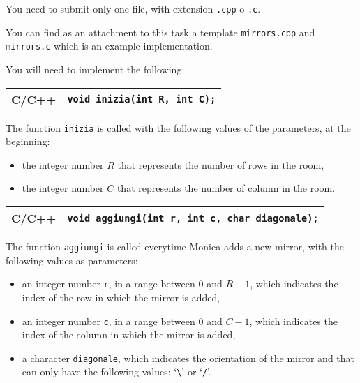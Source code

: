 
\Implementation

You need to submit only one file, with extension \texttt{.cpp} o \texttt{.c}.

\begin{warning}
You can find as an attachment to this task a template \texttt{mirrors.cpp} and \texttt{mirrors.c} which is an example implementation.
\end{warning}

You will need to implement the following:

\begin{center}\begin{tabularx}{\textwidth}{|c|X|}
\hline
C/C++  & \verb|void inizia(int R, int C);|\\
\hline
\end{tabularx}\end{center}

The function \texttt{inizia} is called with the following values of the parameters, at the beginning:
\begin{itemize}[nolistsep]
  \item the integer number $R$ that represents the number of rows in the room,
  \item the integer number $C$ that represents the number of column in the room.
\end{itemize}

\medskip

\begin{center}\begin{tabularx}{\textwidth}{|c|X|}
\hline
C/C++  & \verb|void aggiungi(int r, int c, char diagonale);|\\
\hline
\end{tabularx}\end{center}

The function \texttt{aggiungi} is called everytime Monica adds a new mirror,
with the following values as parameters:
\begin{itemize}[nolistsep]
  \item an integer number \texttt{r}, in a range between $0$ and $R-1$, which indicates the index of the row in which the mirror is added,
  \item an integer number \texttt{c}, in a range between $0$ and $C-1$, which indicates the index of the column in which the mirror is added,
  \item a character \texttt{diagonale}, which indicates the orientation of the mirror and that can only have the following values: `\texttt{\textbackslash}' or `\texttt{/}'.
\end{itemize}

